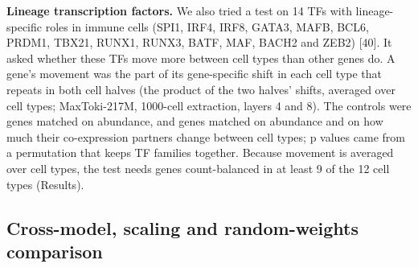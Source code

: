 \documentclass[
  11pt,
]{article}
\begin{document}
\textbf{Lineage transcription factors.} We also tried a test on 14 TFs
with lineage-specific roles in immune cells (SPI1, IRF4, IRF8, GATA3,
MAFB, BCL6, PRDM1, TBX21, RUNX1, RUNX3, BATF, MAF, BACH2 and ZEB2)
{[}40{]}. It asked whether these TFs move more between cell types than
other genes do. A gene's movement was the part of its gene-specific
shift in each cell type that repeats in both cell halves (the product of
the two halves' shifts, averaged over cell types; MaxToki-217M,
1000-cell extraction, layers 4 and 8). The controls were genes matched
on abundance, and genes matched on abundance and on how much their
co-expression partners change between cell types; p values came from a
permutation that keeps TF families together. Because movement is
averaged over cell types, the test needs genes count-balanced in at
least 9 of the 12 cell types (Results).

\subsection{Cross-model, scaling and random-weights
comparison}\label{cross-model-scaling-and-random-weights-comparison}
\end{document}
